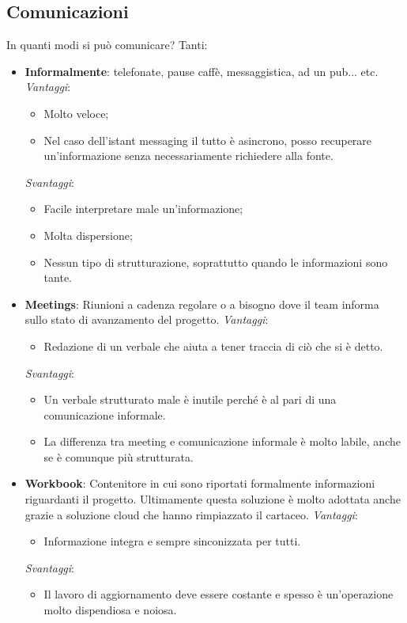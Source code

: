\subsection{Comunicazioni}
In quanti modi si può comunicare? Tanti:
\begin{itemize}
	\item \textbf{Informalmente}: telefonate, pause caffè, messaggistica, ad un pub... etc.\newline
	\textit{Vantaggi}:
	\begin{itemize}
		\item Molto veloce;
		\item Nel caso dell'istant messaging il tutto è asincrono, posso recuperare un'informazione senza necessariamente richiedere alla fonte.
	\end{itemize}
	\textit{Svantaggi}:
	\begin{itemize}
		\item Facile interpretare male un'informazione;
		\item Molta dispersione;
		\item Nessun tipo di strutturazione, soprattutto quando le informazioni sono tante.
	\end{itemize}
	\item \textbf{Meetings}: Riunioni a cadenza regolare o a bisogno dove il team informa sullo stato di avanzamento del progetto.\newline
	\textit{Vantaggi}:
	\begin{itemize}
		\item Redazione di un verbale che aiuta a tener traccia di ciò che si è detto.
	\end{itemize}
	\textit{Svantaggi}:
	\begin{itemize}
		\item Un verbale strutturato male è inutile perché è al pari di una comunicazione informale.
		\item La differenza tra meeting e comunicazione informale è molto labile, anche se è comunque più strutturata.
	\end{itemize}
	\item \textbf{Workbook}: Contenitore in cui sono riportati formalmente informazioni riguardanti il progetto. Ultimamente questa soluzione è molto adottata anche grazie a soluzione cloud che hanno rimpiazzato il cartaceo.\newline
	\textit{Vantaggi}:
	\begin{itemize}
		\item Informazione integra e sempre sinconizzata per tutti.
	\end{itemize}
	\textit{Svantaggi}:
	\begin{itemize}
		\item Il lavoro di aggiornamento deve essere costante e spesso è un'operazione molto dispendiosa e noiosa.
	\end{itemize}
\end{itemize}
